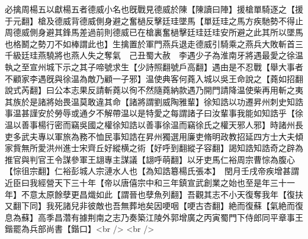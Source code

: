 必擒周楊五以獻楊五者德威小名也旣戰見德威於陳【陳讀曰陣】援槍單騎逐之【援于元翻】槍及德威背德威側身避之奮檛反擊廷珪墜馬【單廷珪之馬方疾馳勢不得止周德威側身避其鋒馬差過前則德威已在槍裏奮檛擊廷珪廷珪安所避之此其所以墜馬也格鬭之勢刀不如棒謂此也】生擒置於軍門燕兵退走德威引騎乘之燕兵大敗斬首三千級廷珪燕驍將也燕人失之奪氣　己丑蜀大赦　李遇少子為淮南牙將遇最愛之徐温執之至宣州城下示之其子啼號求生【少詩照翻號戶高翻】遇由是不忍戰【舉大事者不顧家李遇旣與徐温為敵乃顧一子邪】温使典客何蕘入城以吳王命說之【蕘如招翻說式芮翻】曰公本志果反請斬蕘以徇不然隨蕘納款遇乃開門請降温使柴再用斬之夷其族於是諸將始畏温莫敢違其命【諸將謂劉威陶雅輩】徐知誥以功遷昇州刺史知誥事温甚謹安於勞辱或通夕不解帶温以是特愛之每謂諸子曰汝輩事我能如知誥乎【徐温以善事楊行密而竊吳國之權徐知誥以善事徐温而竊徐氏之權天邪人邪】時諸州長吏多武夫專以軍旅為務不恤民事知誥在昇州獨選用廉吏脩明政教招延四方士大夫傾家貲無所愛洪州進士宋齊丘好縱横之術【好呼到翻縱子容翻】謁知誥知誥奇之辟為推官與判官王令謀參軍王翃專主謀議【翃呼萌翻】以牙吏馬仁裕周宗曹悰為腹心【悰徂宗翻】仁裕彭城人宗漣水人也【為知誥簒楊氏張本】　閏月壬戌帝疾增甚謂近臣曰我經營天下三十年【帝以唐僖宗中和三年鎮宣武創業之始也至是年三十一年】不意太原餘孽更昌熾如此【謂晉也孽魚列翻】吾觀其志不小天復奪我年【復扶又翻下同】我死諸兒非彼敵也吾無葬地矣因哽咽【哽古杏翻】絶而復蘇【氣絶而復息為蘇】高季昌濳有據荆南之志乃奏築江陵外郭增廣之丙寅蜀門下侍郎同平章事王鍇罷為兵部尚書【鍇口】<br />
<br />
